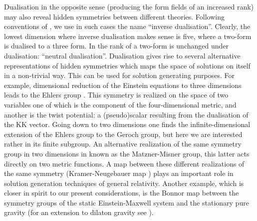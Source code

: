 \documentclass[a4paper,12pt]{article}
\begin{document}
Dualisation in the opposite sense (producing the form fields of
an increased rank) may also reveal hidden symmetries between
different theories. Following conventions of
\cite{CrJuLuPo98a,CrJuLuPo98b}, we use in such cases the name
``inverse dualisation''. Clearly, the lowest dimension where
inverse dualisation makes sense is five, where a two-form is
dualised to a three form. In \coordHE{} the rank of a two-form is
unchanged under dualisation: ``neutral dualisation''.
Dualisation gives rise to several alternative representations
of hidden symmetries which maps the space of solutions on
itself in a non-trivial way. This can be used for solution
generating purposes. For example, dimensional reduction of the
\coordHE{} Einstein equations to three dimensions leads to the
\coordHE{} Ehlers group \cite{Eh59}. This symmetry is realized
on the space of two variables one of which is the component of
the four-dimensional metric, and another is the twist
potential: a (pseudo)scalar resulting from the dualisation of
the KK vector. Going down to two dimensions one finds the
infinite-dimensional extension of the Ehlers group to the
Geroch group, but here we are interested rather in its finite
\coordHE{} subgroup. An alternative realization of the same
\coordHE{} symmetry group in two dimensions in known as the
Matzner-Misner group, this latter acts directly on two metric
functions. A map between these different realizations of the
same symmetry (Kramer-Neugebauer map \cite{NeKr69}) plays an
important role in solution generation techniques of general
relativity. Another example, which is closer in spirit to our
present considerations, is the Bonnor map \cite{Bo61} between
the \coordHE{} symmetry groups of the static Einstein-Maxwell
system and the stationary pure gravity (for an extension to
dilaton gravity see \cite{GaGaKe95}).
\end{document}
